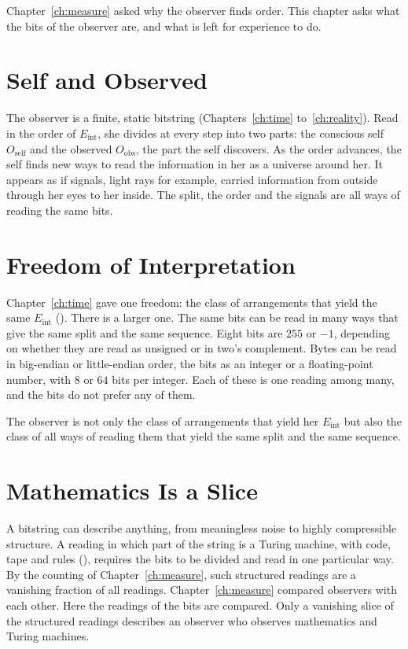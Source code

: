 \documentclass[11pt]{book}
\begin{document}
Chapter~\ref{ch:measure} asked why the observer finds order. This chapter
asks what the bits of the observer are, and what is left for experience to
do.


\section{Self and Observed}
\label{sec:split}

The observer is a finite, static bitstring (Chapters~\ref{ch:time}
to~\ref{ch:reality}). Read in the order of $E_{\mathrm{int}}$, she divides
at every step into two parts: the conscious self $O_{\mathrm{self}}$ and
the observed $O_{\mathrm{obs}}$, the part the self discovers. As the order
advances, the self finds new ways to read the information in her as a
universe around her. It appears as if signals, light rays for example,
carried information from outside through her eyes to her inside. The split,
the order and the signals are all ways of reading the same bits.


\section{Freedom of Interpretation}
\label{sec:freedom}

Chapter~\ref{ch:time} gave one freedom: the class of arrangements that
yield the same $E_{\mathrm{int}}$ (). There is a
larger one. The same bits can be read in many ways that give the same split
and the same sequence. Eight bits are $255$ or $-1$, depending on whether
they are read as unsigned or in two's complement. Bytes can be read in
big-endian or little-endian order, the bits as an integer or a
floating-point number, with $8$ or $64$ bits per integer. Each of these is
one reading among many, and the bits do not prefer any of them.

\begin{deduction}\label{ded:interpretation}
  The observer is not only the class of arrangements that yield her
  $E_{\mathrm{int}}$ but also the class of all ways of reading them that
  yield the same split and the same sequence.
\end{deduction}


\section{Mathematics Is a Slice}
\label{sec:slice}

A bitstring can describe anything, from meaningless noise to highly
compressible structure. A reading in which part of the string is a Turing
machine, with code, tape and rules (), requires the
bits to be divided and read in one particular way. By the counting of
Chapter~\ref{ch:measure}, such structured readings are a vanishing fraction
of all readings. Chapter~\ref{ch:measure} compared observers with each
other. Here the readings of the bits are compared. Only a vanishing slice
of the structured readings describes an observer who observes mathematics
and Turing machines.
\end{document}
